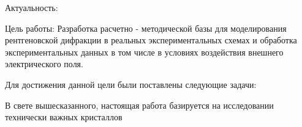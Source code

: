 Актуальность:

Цель работы:
  Разработка расчетно - методической базы для моделирования рентгеновской
  дифракции в реальных экспериментальных схемах и обработка экспериментальных данных
  в том числе в условиях воздействия внешнего электрического поля.

Для достижения данной цели были поставлены следующие задачи:


В свете вышесказанного, настоящая работа базируется на исследовании технически
важных кристаллов
